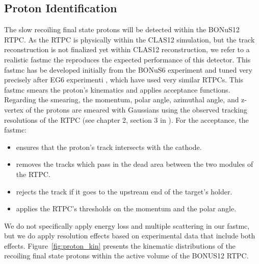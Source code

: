 \subsection{Proton Identification}
The slow recoiling final state protons will be detected within the BONuS12 
RTPC. As the RTPC is physically within the CLAS12 simulation, but the track 
reconstruction is not finalized yet within CLAS12 reconstruction, we refer to a 
realistic fastmc the reproduces the expected performance of this detector. This 
fastmc has be developed initially from the BONuS6 experiment and tuned very 
precisely after EG6 experimenti \cite{eg6_note}, which have used very similar 
RTPCs.  This fastmc smears the proton's kinematics and applies acceptance 
functions. Regarding the smearing, the momentum, polar angle, azimuthal angle, 
and z-vertex of the protons are smeared with Gaussians using the observed 
tracking resolutions of the RTPC (see chapter 2, section 3 in \cite{eg6_note}).  
For the acceptance, the fastmc:
\begin{itemize}
   \item ensures that the proton's track intersects with the cathode.
   \item removes the tracks which pass in the dead area between the two modules 
      of the RTPC.
\item rejects the track if it goes to the upstream end of the target's holder.
\item applies the RTPC's thresholds on the momentum and the polar angle.
\end{itemize} 
We do not specifically apply energy loss and multiple scattering in our fastmc, 
but we do apply resolution effects based on experimental data that include both 
effects. Figure~\ref{fig:proton_kin} presents the kinematic distributions of 
the recoiling final state protons within the active volume of the BONUS12 RTPC. 

